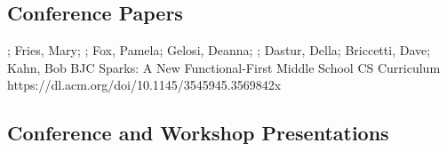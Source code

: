 \subsection{Conference Papers}
\vspace{5pt}
\begin{etaremune}
    \setlength\itemsep{1em}
    \item{\dan; Fries, Mary; \me; Fox, Pamela;  Gelosi, Deanna; \lauren; Dastur, Della; Briccetti, Dave; Kahn, Bob
    \newline 
    BJC Sparks: A New Functional-First Middle School CS Curriculum
    \newline
    https://dl.acm.org/doi/10.1145/3545945.3569842x}
\end{etaremune}

\subsection{Conference and Workshop Presentations}
\vspace{5pt}

